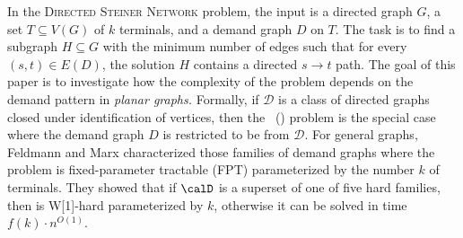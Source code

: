 In the \textsc{Directed Steiner Network} problem, the input is a directed graph $G$, a set $T\subseteq V(G)$ of $k$ terminals, and a demand graph $D$ on $T$. The task is to find a subgraph $H\subseteq G$ with the minimum number of edges such that for every $(s,t)\in E(D)$, the solution $H$ contains a directed $s\to t$ path. 
The goal of this paper is to investigate how the complexity of the problem depends on the demand pattern in \emph{planar graphs.} Formally, if $\mathcal{D}$ is a class of directed graphs closed under identification of vertices, then the \Dsngenfull\ (\Dsngen) problem is the special case where the demand graph $D$ is restricted to be from $\mathcal{D}$.
For general graphs, Feldmann and Marx \cite{FeldmannM16} characterized those families of demand graphs where the problem is fixed-parameter tractable (FPT) parameterized by the number $k$ of terminals. 
They showed that if $\calD$ is a superset of one of five hard families, then \Dsngen is W[1]-hard parameterized by $k$, otherwise it can be solved in time $f(k)\cdot n^{O(1)}$.

